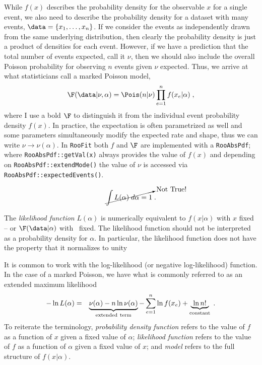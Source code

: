 While $f(x)$ describes the probability density for the observable $x$ for a single event, we also need to describe the probability density for a dataset with many events, $\data = \{x_1,\dots,x_{n}\}$.  If we consider the events as independently drawn from the same underlying distribution, then clearly the probability density is just a product of densities for each event.  However, if we have  a prediction that the total number of events expected, call it $\nu$, then we should also include the overall Poisson probability for observing $n$ events given $\nu$ expected.  Thus, we arrive at what statisticians call a marked Poisson model,
\begin{equation}
\label{Eq:markedPoisson}
\F(\data|\nu,\alpha) = \Pois(n|\nu) \prod_{e=1}^n f(x_e|\alpha) \; ,
\end{equation}
where I use a bold $\F$ to distinguish it from the individual event probability density $f(x)$.  In practice, the expectation is often parametrized as well and some parameters simultaneously modify the expected rate and shape, thus we can write $\nu\rightarrow\nu(\alpha)$.  In \texttt{RooFit} both $f$ and $\F$ are implemented with a \texttt{RooAbsPdf}; where \texttt{RooAbsPdf::getVal(x)} always provides the value of $f(x)$ and depending on \texttt{RooAbsPdf::extendMode()} the value of $\nu$ is accessed via \texttt{RooAbsPdf::expectedEvents()}.


\begin{equation}
\cancelto{\mathrm{Not ~True!}}{\int L(\alpha) \;d\alpha = 1}\; .
\end{equation}


The \emph{likelihood function} $L(\alpha)$ is numerically equivalent to $f(x|\alpha)$ with $x$ fixed -- or $\F(\data|\alpha)$ with \data\ fixed.  The likelihood function should not be interpreted as a probability density for $\alpha$.  In particular, the likelihood function does not have the property that it normalizes to unity


It is common to work with the log-likelihood (or negative log-likelihood) function.  In the case of a marked Poisson, we have what is commonly referred to as an extended maximum likelihood~\cite{Barlow1990496}
\begin{eqnarray}
-\ln L( \alpha) &=& \underbrace{\nu(\alpha) - n \ln \nu(\alpha)}_{\rm extended~term} - \sum_{e=1}^n \ln f(x_e)   + \underbrace{~\ln n! ~}_{\mathrm{constant}}\; .
\end{eqnarray}
To reiterate the terminology, \emph{probability density function} refers to the value of $f$ as a function of $x$ given a fixed value of $\alpha$; \emph{likelihood function} refers to the value of $f$ as a function of $\alpha$ given a fixed value of $x$; and \emph{model} refers to the full structure of $f(x|\alpha)$.


